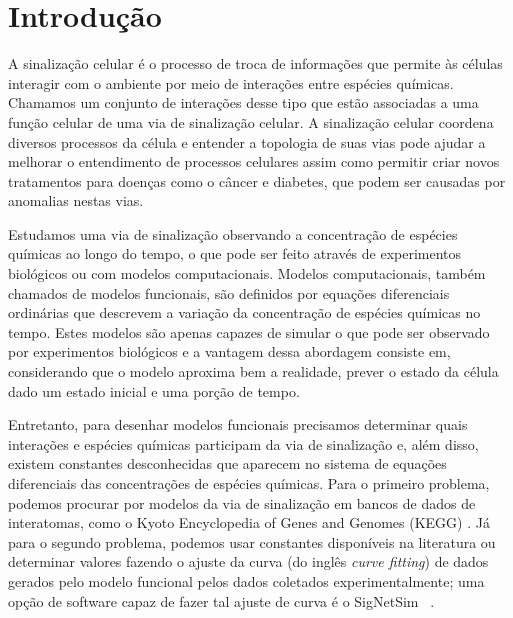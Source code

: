 \documentclass[12pt]{article}
\begin{document}
\section{Introdução}

A sinalização celular é o processo de troca de informações que permite
às células interagir com o ambiente por meio de interações entre
espécies químicas. Chamamos um conjunto de interações desse tipo que 
estão associadas a uma função celular de uma via de sinalização celular.
A sinalização celular coordena diversos processos da célula e entender 
a topologia de suas vias pode ajudar a melhorar o entendimento de 
processos celulares assim como permitir criar novos tratamentos para 
doenças como o câncer e diabetes, que podem ser causadas por anomalias 
nestas vias.

Estudamos uma via de sinalização observando a concentração de espécies
químicas ao longo do tempo, o que pode ser feito através de experimentos
biológicos ou com modelos computacionais. Modelos computacionais, também
chamados de modelos funcionais, são definidos por equações diferenciais
ordinárias que descrevem a variação da concentração de espécies químicas
no tempo. Estes modelos são apenas capazes de simular o que pode ser 
observado por experimentos biológicos e a vantagem dessa abordagem 
consiste em, considerando que o modelo aproxima bem a realidade, prever 
o estado da célula dado um estado inicial e uma porção de tempo.

Entretanto, para desenhar modelos funcionais precisamos determinar 
quais interações e espécies químicas participam da via de sinalização e,
além disso, existem constantes desconhecidas que aparecem no sistema de 
equações diferenciais das concentrações de espécies químicas. Para o 
primeiro problema, podemos procurar por modelos da via de sinalização
em bancos de dados de interatomas, como o Kyoto Encyclopedia of Genes 
and Genomes (KEGG) \cite{Kanehisa2000kegg}. Já para o segundo problema, 
podemos usar constantes disponíveis na literatura ou determinar valores
fazendo o ajuste da curva (do inglês \emph{curve fitting}) de dados
gerados pelo modelo funcional pelos dados coletados experimentalmente;
uma opção de software capaz de fazer tal ajuste de curva é o SigNetSim 
~\cite{Noel2017SigNetSim}.
\end{document}

